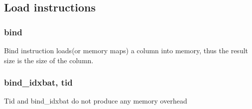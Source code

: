 \subsection{Load instructions}
\subsubsection{bind}
Bind instruction loads(or memory maps) a column into memory,
thus the result size is the size of the column.
\subsubsection{bind\_idxbat, tid}
Tid and bind\_idxbat do not produce any memory overhead
